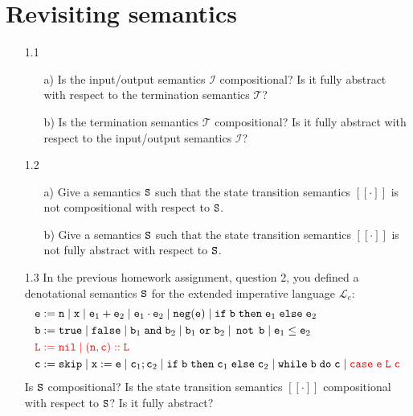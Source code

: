 \documentclass{article}
\begin{document}
\section{Revisiting semantics}
\begin{enumerate}
\item[1.1] 
\begin{enumerate}
	\item[a)] Is the input/output semantics $\mathcal{I}$ compositional? Is it fully abstract with respect to the termination semantics $\mathcal{T}$?
  \item[b)] Is the termination semantics $\mathcal{T}$ compositional? Is it fully abstract with respect to the input/output semantics $\mathcal{I}$?
\end{enumerate}
\item[1.2]
\begin{enumerate}
	\item[a)] Give a semantics $\mathtt{S}$ such that the state transition semantics $[[\cdot]]$ is not compositional with respect to $\mathtt{S}$.
	\item[b)] Give a semantics $\mathtt{S}$ such that the state transition semantics $[[\cdot]]$ is not fully abstract with respect to $\mathtt{S}$.
	\end{enumerate}

\item[1.3] In the previous homework assignment, question 2, you defined a denotational semantics $\mathtt{S}$ for the extended imperative language $\mathcal{L}_e$:
\begin{align*}
& \mathtt{e} := \mathtt{n} \; | \; \mathtt{x} \; | \; \mathtt{e}_1 + \mathtt{e}_2 \; | \; \mathtt{e}_1 \cdot \mathtt{e}_2 \; | \; \mathtt{neg}(\mathtt{e}) \; | \; \mathtt{if} \; \mathtt{b} \; \mathtt{then} \; \mathtt{e}_1 \; \mathtt{else} \; \mathtt{e}_2 \\ 
& \mathtt{b} := \mathtt{true} \; | \; \mathtt{false} \; | \; \mathtt{b}_1 \; \mathtt{and} \; \mathtt{b}_2 \; | \; \mathtt{b}_1 \; \mathtt{or} \; \mathtt{b}_2 \; | \; \mathop{\mathtt{not}} \; \mathtt{b} \; | \; \mathtt{e}_1 \leq \mathtt{e}_2 \\
& {\color{red} \mathtt{L} := \mathtt{nil} \; | \; (\mathtt{n},\mathtt{c})::\mathtt{L}} \\
& \mathtt{c} := \mathtt{skip} \; | \; \mathtt{x} := \mathtt{e} \; | \; \mathtt{c}_1 ; \mathtt{c}_2 \; | \; \mathtt{if} \; \mathtt{b} \; \mathtt{then} \; \mathtt{c}_1 \; \mathtt{else} \; \mathtt{c}_2 \; | \; \mathtt{while} \; \mathtt{b} \; \mathtt{do} \; \mathtt{c} \; | \; {\color{red} \mathtt{case} \; \mathtt{e} \; \mathtt{L} \; \mathtt{c}}
\end{align*}
Is $\mathtt{S}$ compositional? Is the state transition semantics $[[\cdot]]$ compositional with respect to $\mathtt{S}$? Is it fully abstract?
\end{enumerate}
\end{document}
